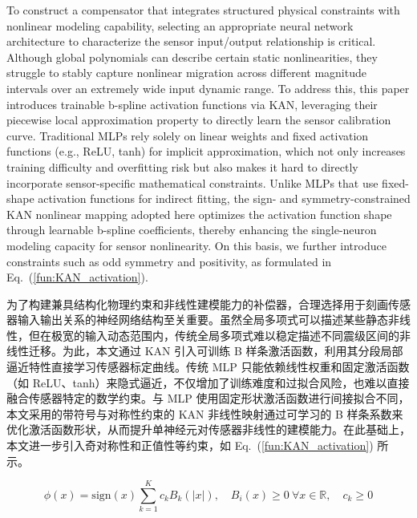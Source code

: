 \documentclass[sn-nature]{sn-jnl}
\newif\ifCNENEnglish
\newif\ifCNENBilingual
\newcommand{\CNEN}[2]{%
    \ifCNENBilingual
        #1%
        \if\relax\detokenize{#2}\relax\else\par #2\fi%
    \else
        \ifCNENEnglish
            #2%
        \else
            #1%
        \fi
    \fi
}
\begin{document}
\CNEN{为了构建兼具结构化物理约束和非线性建模能力的补偿器，合理选择用于刻画传感器输入输出关系的神经网络结构至关重要。虽然全局多项式可以描述某些静态非线性，但在极宽的输入动态范围内，传统全局多项式难以稳定描述不同震级区间的非线性迁移。为此，本文通过 KAN 引入可训练 B 样条激活函数，利用其分段局部逼近特性直接学习传感器标定曲线。传统 MLP 只能依赖线性权重和固定激活函数（如 ReLU、tanh）来隐式逼近，不仅增加了训练难度和过拟合风险，也难以直接融合传感器特定的数学约束。与 MLP 使用固定形状激活函数进行间接拟合不同，本文采用的带符号与对称性约束的 KAN 非线性映射通过可学习的 B 样条系数来优化激活函数形状，从而提升单神经元对传感器非线性的建模能力。在此基础上，本文进一步引入奇对称性和正值性等约束，如 Eq.~(\ref{fun:KAN_activation}) 所示。}{To construct a compensator that integrates structured physical constraints with nonlinear modeling capability, selecting an appropriate neural network architecture to characterize the sensor input/output relationship is critical. Although global polynomials can describe certain static nonlinearities, they struggle to stably capture nonlinear migration across different magnitude intervals over an extremely wide input dynamic range. To address this, this paper introduces trainable b-spline activation functions via KAN, leveraging their piecewise local approximation property to directly learn the sensor calibration curve. Traditional MLPs rely solely on linear weights and fixed activation functions (e.g., ReLU, tanh) for implicit approximation, which not only increases training difficulty and overfitting risk but also makes it hard to directly incorporate sensor-specific mathematical constraints. Unlike MLPs that use fixed-shape activation functions for indirect fitting, the sign- and symmetry-constrained KAN nonlinear mapping adopted here optimizes the activation function shape through learnable b-spline coefficients, thereby enhancing the single-neuron modeling capacity for sensor nonlinearity. On this basis, we further introduce constraints such as odd symmetry and positivity, as formulated in Eq.~(\ref{fun:KAN_activation}).%
}\begin{equation}
    \phi(x) = \text{sign}(x) \sum_{k=1}^{K} c_k B_k(|x|), \quad B_i(x) \geq 0 \ \forall x \in \mathbb{R}, \quad c_k \geq 0
    \label{fun:KAN_activation}
\end{equation}
\end{document}
